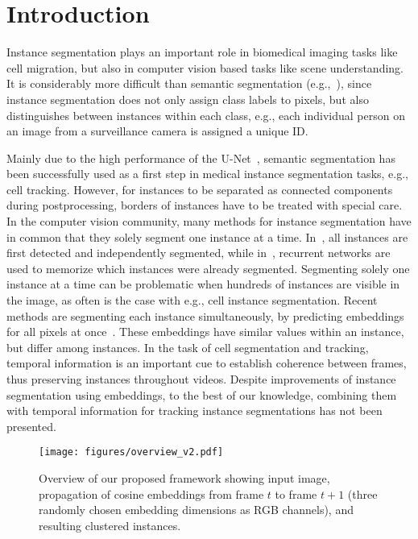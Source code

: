 \documentclass[runningheads,a4paper]{llncs}
\begin{document}
\section{Introduction}
\label{sec:intro}

\nocite{*}


Instance segmentation plays an important role in biomedical imaging tasks like cell migration, but also in computer vision based tasks like scene understanding.
It is considerably more difficult than semantic segmentation (e.g.,~\cite{Payer2018}), since instance segmentation does not only assign class labels to pixels, but also distinguishes between instances within each class, e.g., each individual person on an image from a surveillance camera is assigned a unique ID.


Mainly due to the high performance of the U-Net~\cite{Ronneberger2015}, semantic segmentation has been successfully used as a first step in medical instance segmentation tasks, e.g., cell tracking.
However, for instances to be separated as connected components during postprocessing, borders of instances have to be treated with special care.
In the computer vision community, many methods for instance segmentation have in common that they solely segment one instance at a time.
In~\cite{He2017}, all instances are first detected and independently segmented, while in~\cite{Ren2017}, recurrent networks are used to memorize which instances were already segmented.
Segmenting solely one instance at a time can be problematic when hundreds of instances are visible in the image, as often is the case with e.g., cell instance segmentation.
Recent methods are segmenting each instance simultaneously, by predicting embeddings for all pixels at once~\cite{Newell2017,Kong2017}.
These embeddings have similar values within an instance, but differ among instances.
In the task of cell segmentation and tracking, temporal information is an important cue to establish coherence between frames, thus preserving instances throughout videos.
Despite improvements of instance segmentation using embeddings, to the best of our knowledge, combining them with temporal information for tracking instance segmentations has not been presented.






\begin{figure}[t]
\centering
\texttt{[image: figures/overview\_v2.pdf]}
\caption{Overview of our proposed framework showing input image, propagation of cosine embeddings from frame $t$ to frame $t+1$ (three randomly chosen embedding dimensions as RGB channels), and resulting clustered instances.}
\label{fig:overview}
\end{figure}
\end{document}
